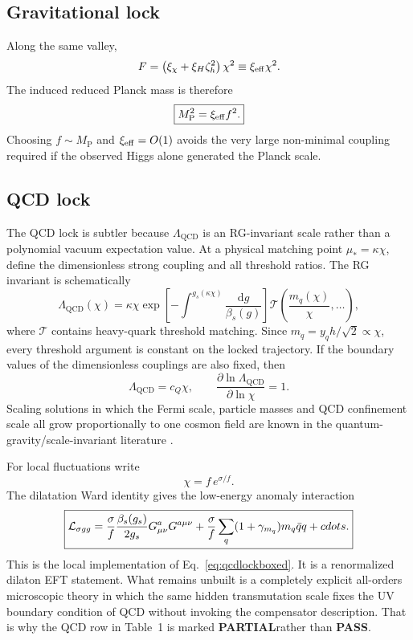 \documentclass[11pt,a4paper]{article}
\newcommand{\dd}{\mathrm{d}}
\newcommand{\Lag}{\mathcal{L}}
\newcommand{\MP}{M_{\mathrm P}}
\newcommand{\QCD}{\mathrm{QCD}}
\newcommand{\Pass}{\textcolor{deepgreen}{\textbf{PASS}}}
\newcommand{\Partial}{\textcolor{deepamber}{\textbf{PARTIAL}}}
\begin{document}
\subsection{Gravitational lock}

Along the same valley,
\begin{equation}
F=\left(\xi_\chi+\xi_H\zeta_h^2\right)\chi^2
\equiv\xi_{\rm eff}\chi^2.
\label{eq:Feff}
\end{equation}
The induced reduced Planck mass is therefore
\begin{equation}
\boxed{
\MP^2=\xi_{\rm eff}f^2.
}
\label{eq:Mpllock}
\end{equation}
Choosing $f\sim\MP$ and $\xi_{\rm eff}=O(1)$ avoids the very large non-minimal coupling required if the observed Higgs alone generated the Planck scale.

\subsection{QCD lock}

The QCD lock is subtler because $\Lambda_{\QCD}$ is an RG-invariant scale rather than a polynomial vacuum expectation value. At a physical matching point $\mu_*=\kappa\chi$, define the dimensionless strong coupling and all threshold ratios. The RG invariant is schematically
\begin{equation}
\Lambda_{\QCD}(\chi)=
\kappa\chi
\exp\left[-\int^{g_s(\kappa\chi)}\frac{\dd g}{\beta_s(g)}\right]
\mathcal T\!\left(
\frac{m_q(\chi)}{\chi},\ldots
\right),
\label{eq:qcdlock}
\end{equation}
where $\mathcal T$ contains heavy-quark threshold matching. Since $m_q=y_qh/\sqrt2\propto\chi$, every threshold argument is constant on the locked trajectory. If the boundary values of the dimensionless couplings are also fixed, then
\begin{equation}
\boxed{
\Lambda_{\QCD}=c_Q\chi,
\qquad
\frac{\partial\ln\Lambda_{\QCD}}{\partial\ln\chi}=1.
}
\label{eq:qcdlockboxed}
\end{equation}
Scaling solutions in which the Fermi scale, particle masses and QCD confinement scale all grow proportionally to one cosmon field are known in the quantum-gravity/scale-invariant literature \cite{Wetterich2026}.

For local fluctuations write
\[
\chi=f\,e^{\sigma/f}.
\]
The dilatation Ward identity gives the low-energy anomaly interaction
\begin{equation}
\boxed{
\Lag_{\sigma gg}=\frac{\sigma}{f}
\frac{\beta_s(g_s)}{2g_s}G^a_{\mu\nu}G^{a\mu\nu}
+\frac{\sigma}{f}\sum_q(1+\gamma_{m_q})m_q\bar q q+\\cdots .
}
\label{eq:anomaly}
\end{equation}
This is the local implementation of Eq.~\eqref{eq:qcdlockboxed}. It is a renormalized dilaton EFT statement. What remains unbuilt is a completely explicit all-orders microscopic theory in which the same hidden transmutation scale fixes the UV boundary condition of QCD without invoking the compensator description. That is why the QCD row in Table~1 is marked \Partial rather than \Pass.
\end{document}

